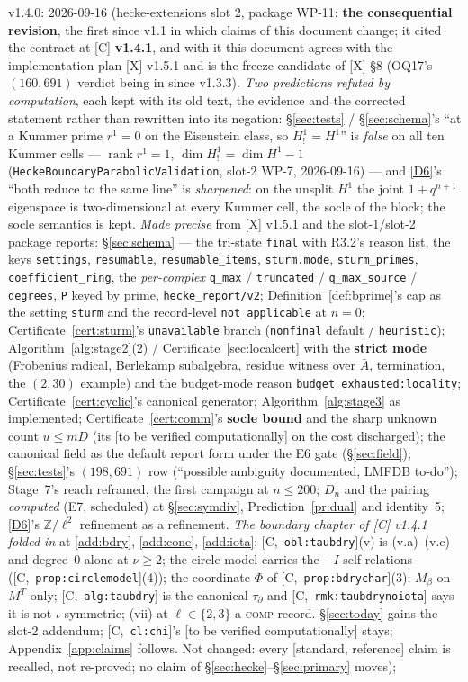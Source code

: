 \documentclass[11pt]{article}
\theoremstyle{remark}
\newcommand{\Z}{\mathbb{Z}}
\DeclareMathOperator{\rank}{rank}
\newcommand{\Dn}{D_n}
\newcommand{\HA}[1]{[C,~\texttt{#1}]}      %
\newcommand{\STD}{\textsf{[standard, reference]}}
\newcommand{\VERIFY}{\textsf{[to be verified computationally]}}
\begin{document}
v1.4.0: 2026-09-16 (hecke-extensions slot 2, package WP-11: \textbf{the
consequential revision}, the first since v1.1 in which claims of this document change; it cited
the contract at [C] \textbf{v1.4.1}, and with it this document agrees with the implementation plan
[X] v1.5.1 and is the freeze candidate of [X] \S8 (OQ17's $(160,691)$ verdict being in since
v1.3.3). \emph{Two predictions refuted by computation}, each kept with its old text, the evidence
and the corrected statement rather than rewritten into its negation: \S\ref{sec:tests} /
\S\ref{sec:schema}'s ``at a Kummer prime $r^1=0$ on the Eisenstein class, so $H^1_!=H^1$'' is
\emph{false} on all ten Kummer cells --- $\rank r^1=1$, $\dim H^1_!=\dim H^1-1$
(\texttt{HeckeBoundaryParabolicValidation}, slot-2 WP-7, 2026-09-16) --- and \ref{D6}'s ``both
reduce to the same line'' is \emph{sharpened}: on the unsplit $H^1$ the joint $1+q^{n+1}$
eigenspace is two-dimensional at every Kummer cell, the socle of the block; the socle semantics
is kept. \emph{Made precise} from [X] v1.5.1 and the slot-1/slot-2 package reports:
\S\ref{sec:schema} --- the tri-state \texttt{final} with R3.2's reason list, the keys
\texttt{settings}, \texttt{resumable}, \texttt{resumable\_items}, \texttt{sturm.mode},
\texttt{sturm\_primes}, \texttt{coefficient\_ring}, the \emph{per-complex} \texttt{q\_max} /
\texttt{truncated} / \texttt{q\_max\_source} / \texttt{degrees}, \texttt{P} keyed by prime,
\texttt{hecke\_report/v2}; Definition~\ref{def:bprime}'s cap as the setting \texttt{sturm} and
the record-level \texttt{not\_applicable} at $n=0$; Certificate~\ref{cert:sturm}'s
\texttt{unavailable} branch (\texttt{nonfinal} default / \texttt{heuristic});
Algorithm~\ref{alg:stage2}(2) / Certificate~\ref{sec:localcert} with the \textbf{strict mode}
(Frobenius radical, Berlekamp subalgebra, residue witness over $\bar A$, termination, the
$(2,30)$ example) and the budget-mode reason \texttt{budget\_exhausted:locality};
Certificate~\ref{cert:cyclic}'s canonical generator; Algorithm~\ref{alg:stage3} as implemented;
Certificate~\ref{cert:comm}'s \textbf{socle bound} and the sharp unknown count $u\le mD$ (its
\VERIFY{} on the cost discharged); the canonical field as the default report form under the E6
gate (\S\ref{sec:field}); \S\ref{sec:tests}'s $(198,691)$ row (``possible ambiguity documented,
LMFDB to-do''); Stage~7's reach reframed, the first campaign at $n\le200$; $\Dn$ and the pairing
\emph{computed} (E7, scheduled) at \S\ref{sec:symdiv}, Prediction~\ref{pr:dual} and identity~5;
\ref{D6}'s $\Z/\ell^2$ refinement as a refinement. \emph{The boundary chapter of [C] v1.4.1
folded in} at \ref{add:bdry}, \ref{add:cone}, \ref{add:iota}: \HA{obl:taubdry}(v) is
(v.a)--(v.c) and degree~$0$ alone at $\nu\ge2$; the circle model carries the $-I$
self-relations (\HA{prop:circlemodel}(4)); the coordinate $\Phi$ of \HA{prop:bdrychar}(3);
$M_\beta$ on $M^T$ only; \HA{alg:taubdry} is the canonical $\tau_\partial$ and
\HA{rmk:taubdrynoiota} says it is not $\iota$-symmetric; (vii) at $\ell\in\{2,3\}$ a
\textsc{comp} record. \S\ref{sec:today} gains the slot-2 addendum; \HA{cl:chi}'s \VERIFY{} stays;
Appendix~\ref{app:claims} follows. Not changed: every \STD{} claim is recalled, not re-proved;
no claim of \S\ref{sec:hecke}--\S\ref{sec:primary} moves);
\end{document}
